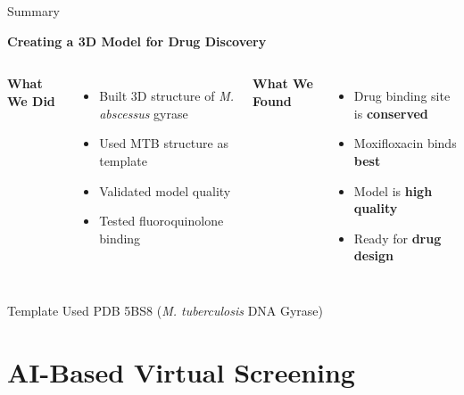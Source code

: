 \documentclass[aspectratio=169,xcolor=table]{beamer}
\begin{document}
\begin{frame}{Summary}

\begin{center}
\textbf{\Large Creating a 3D Model for Drug Discovery}
\end{center}

\vspace{0.3cm}

\begin{columns}
\textbf{What We Did}
\begin{itemize}\setlength{\itemsep}{0pt}
    \item Built 3D structure of \textit{M. abscessus} gyrase
    \item Used MTB structure as template
    \item Validated model quality
    \item Tested fluoroquinolone binding
\end{itemize}

\textbf{What We Found}
\begin{itemize}\setlength{\itemsep}{0pt}
    \item Drug binding site is \textbf{conserved}
    \item Moxifloxacin binds \textbf{best}
    \item Model is \textbf{high quality}
    \item Ready for \textbf{drug design}
\end{itemize}
\end{columns}

\vspace{0.3cm}

\begin{block}{Template Used}
PDB 5BS8 (\textit{M. tuberculosis} DNA Gyrase)
\end{block}

\end{frame}

\section{AI-Based Virtual Screening}

\end{document}
